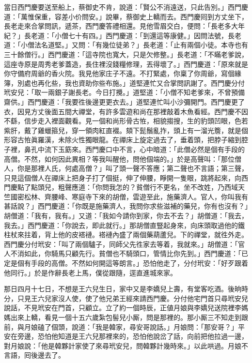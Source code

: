 當日西門慶要送至船上，蔡御史不肯，說道：「賢公不消遠送，只此告別。」西門慶道：「萬惟保重，容差小价問安。」說畢，蔡御史上轎而去。西門慶囘到方丈坐下，長老走來合掌問訊，遞茶，西門慶答禮相還。見他雪眉交白，便問：「長老多大年紀？」長老道：「小僧七十有四。」西門慶道：「到還這等康健。」因問法號，長老道：「小僧法名道堅。」又問：「有幾位徒弟？」長老道：「止有兩個小徒。本寺也有三十餘僧行。」西門慶道：「這寺院也寬大，只是欠修整。」長老道：「不瞞老爹說，這座寺原是周秀老爹蓋造，長住裡沒錢糧修理，丟得壞了。」西門慶道：「原來就是你守備府周爺的香火院。我見他家庄子不遠。不打緊處，你稟了你周爺，寫個緣簿，別處也再化些，我也資助你些布施。」道堅連忙又合掌問訊謝了。西門慶分付玳安兒：「取一兩銀子謝長老。今日打攪。」道堅道：「小僧不知老爹來，不曾預備齋供。」西門慶道：「我要徃後邊更更衣去。」道堅連忙叫小沙彌開門。西門慶更了衣，因見方丈後面五間大禪堂，有許多雲遊和尚在那裡敲着木魚看經。西門慶不因不繇，信步走入裡面觀看。見一個和尚形骨古恠，相貌搊搜，生的豹頭凹眼，色若紫肝，戴了雞蠟箍兒，穿一領肉紅直裰。頦下髭鬚亂拃，頭上有一溜光簷，就是個形容古恠眞羅漢，未除火性獨眼龍。{}在禪床上旋定過去了，垂着頭，把脖子縮到腔子裡，鼻孔中流下玉筯來。西門慶口中不言，心中暗道：「此僧必然是個有手段的高僧。不然，如何因此異相？等我叫醒他，問他個端的。」於是高聲叫：「那位僧人，你是那裡人氏，何處高僧？」叫了頭一聲不答應；第二聲也不言語；第三聲，只見這個僧人在禪床上把身子打了個挺，伸了伸腰，睜開一隻眼，跳將起來，向西門慶點了點頭兒，{}粗聲應道：「你問我怎的？貧僧行不更名，坐不改姓，乃西域天竺國密松林、齊腰峰、寒庭寺下來的胡僧，雲遊至此，施藥濟人。官人，你叫我有甚話說？」西門慶道：「你既是施藥濟人，我問你求些滋補的藥兒，你有也沒有？」胡僧道：「我有，我有。」又道：「我如今請你到家，你去不去？」胡僧道：「我去，我去。」西門慶道：「你說去，即此就行。」那胡僧直豎起身來，向床頭取過他的鐵柱杖來拄着，背上他的皮褡褳。褡褳內盛了兩個藥葫蘆兒。下的禪堂，就徃外走。西門慶分付玳安：「叫了兩個驢子，同師父先徃家去等着，我就來。」胡僧道：「官人不消如此，你騎馬只顧先行。貧僧也不騎頭口，管情比你先到。」西門慶道：「已定是個有手段的高僧。不然如何開這等朗言。」恐怕他走了，分付玳安：「好歹跟着他同行。」於是作辭長老上馬，僕從跟隨，逕直進城來家。

那日四月十七日，不想是王六兒生日，家中又是李嬌兒上壽，有堂客吃酒。後晌時分，只見王六兒家沒人使，使了他兄弟王經來請西門慶。分付他宅門首只尋玳安兒說話，不見玳安在門首，只顧立。立了約一個時辰，正値月娘與李嬌兒送院裡李媽媽出來上轎，看見一個十五六歲紮包髻兒小厮，問是那裡的。那小厮三不知走到跟前，與月娘磕了個頭，說道：「我是韓家，尋安哥說話。」月娘問：「那安哥？」平安在旁邊，恐怕他知道是王六兒那裡來的，恐怕他說岔了話，向前把他拉過一邊，對月娘說：「他是韓夥計家使了來尋玳安兒，問韓夥計幾時來。」以此哄過。月娘不言語，囘後邊去了。

